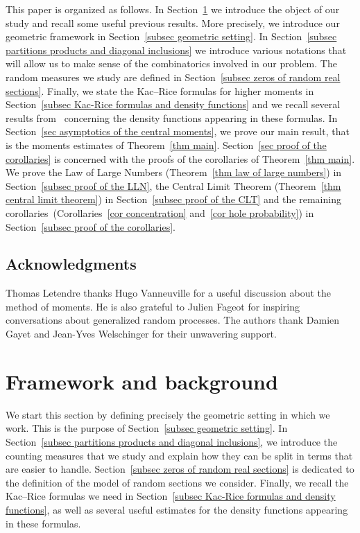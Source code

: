 \documentclass[AHL,Unicode,longabstracts,published]{cedram}
\begin{document}
This paper is organized as follows. In Section~\ref{sec framework and background} we introduce the object of our study and recall some useful previous results. More precisely, we introduce our geometric framework in Section~\ref{subsec geometric setting}. In Section~\ref{subsec partitions products and diagonal inclusions} we introduce various notations that will allow us to make sense of the combinatorics involved in our problem. The random measures we study are defined in Section~\ref{subsec zeros of random real sections}. Finally, we state the Kac--Rice formulas for higher moments in Section~\ref{subsec Kac-Rice formulas and density functions} and we recall several results from~\cite{Anc2019} concerning the density functions appearing in these formulas. In Section~\ref{sec asymptotics of the central moments}, we prove our main result, that is the moments estimates of Theorem~\ref{thm main}. Section~\ref{sec proof of the corollaries} is concerned with the proofs of the corollaries of Theorem~\ref{thm main}. We prove the Law of Large Numbers (Theorem~\ref{thm law of large numbers}) in Section~\ref{subsec proof of the LLN}, the Central Limit Theorem (Theorem~\ref{thm central limit theorem}) in Section~\ref{subsec proof of the CLT} and the remaining corollaries~(Corollaries~\ref{cor concentration} and~\ref{cor hole probability}) in Section~\ref{subsec proof of the corollaries}.


\subsection*{Acknowledgments}

Thomas Letendre thanks Hugo Vanneuville for a useful discussion about the method of moments. He is also grateful to Julien Fageot for inspiring conversations about generalized random processes. The authors thank Damien Gayet and Jean-Yves Welschinger for their unwavering support.



\section{Framework and background}\label{sec framework and background}

We start this section by defining precisely the geometric setting in which we work. This is the purpose of Section~\ref{subsec geometric setting}. In Section~\ref{subsec partitions products and diagonal inclusions}, we introduce the counting measures that we study and explain how they can be split in terms that are easier to handle. Section~\ref{subsec zeros of random real sections} is dedicated to the definition of the model of random sections we consider. Finally, we recall the Kac--Rice formulas we need in Section~\ref{subsec Kac-Rice formulas and density functions}, as well as several useful estimates for the density functions appearing in these formulas.
\end{document}
